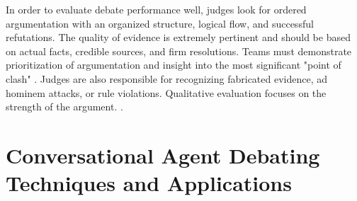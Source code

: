 \documentclass[conference]{IEEEtran}
\begin{document}
In order to evaluate debate performance well, judges look for ordered argumentation with an organized structure, logical flow, and successful refutations. The quality of evidence is extremely pertinent and should be based on actual facts, credible sources, and firm resolutions. Teams must demonstrate prioritization of argumentation and insight into the most significant "point of clash" \cite{shuster2025judging}. Judges are also responsible for recognizing fabricated evidence, ad hominem attacks, or rule violations. Qualitative evaluation focuses on the strength of the argument. \cite{debatingforeveryone2025judge}\cite{shuster2025judging}.

\section{Conversational Agent Debating Techniques and Applications}
\end{document}
